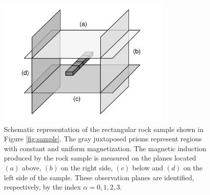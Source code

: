\documentclass[galley,gc]{agutex}
\begin{document}
 \begin{figure}
 \noindent \includegraphics[width=20pc]{Figs/Fig2_HQ.pdf}
 \caption{Schematic representation of the rectangular rock sample 
 shown in Figure \ref{fig:sample}. The gray juxtaposed prisms represent 
 regions with constant and uniform magnetization. The magnetic induction produced 
 by the rock sample is measured on the planes located $\left(a\right)$ above, 
 $\left(b\right)$ on the right side, $\left(c\right)$ below and 
 $\left(d\right)$ on the left side of the sample. These observation 
 planes are  identified, respectively, by the index 
 $\alpha = 0, 1, 2, 3$.}
 \label{fig:sample-planes}
 \end{figure}
 
\end{document}
